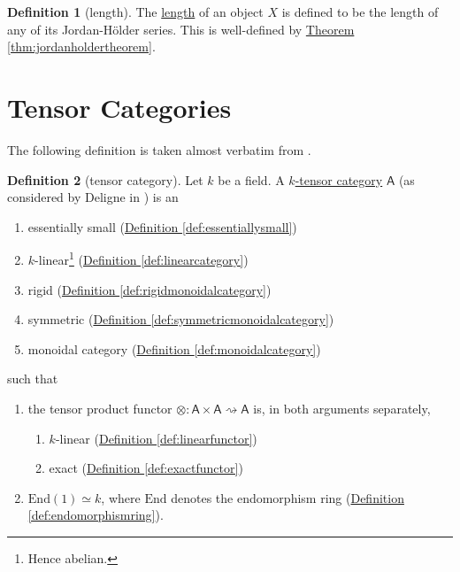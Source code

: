 \documentclass[a4paper,10pt]{scrreprt}
\newcommand{\defn}[1]{\ul{#1}}
\theoremstyle{definition}
\newtheorem{definition}{Definition}[section]
\theoremstyle{plain}
\theoremstyle{remark}
\begin{document}
\begin{definition}[length]
  \label{def:length}
  The \defn{length} of an object $X$ is defined to be the length of any of its Jordan-H{\"o}lder series. This is well-defined by \hyperref[thm:jordanholdertheorem]{Theorem \ref*{thm:jordanholdertheorem}}.
\end{definition}


\section{Tensor Categories}
The following definition is taken almost verbatim from \cite{nlab-deligne-theorem}.
\begin{definition}[tensor category]
  \label{def:tensorcategory}
  Let $k$ be a field. A \defn{$k$-tensor category} $\mathsf{A}$ (as considered by Deligne in \cite{deligne-categories-tensorielle}) is an
  \begin{enumerate}
    \item essentially small (\hyperref[def:essentiallysmall]{Definition \ref*{def:essentiallysmall}})

    \item $k$-linear\footnote{Hence abelian.} (\hyperref[def:linearcategory]{Definition \ref*{def:linearcategory}})

    \item rigid (\hyperref[def:rigidmonoidalcategory]{Definition \ref*{def:rigidmonoidalcategory}})

    \item symmetric (\hyperref[def:symmetricmonoidalcategory]{Definition \ref*{def:symmetricmonoidalcategory}})

    \item monoidal category (\hyperref[def:monoidalcategory]{Definition \ref*{def:monoidalcategory}})
  \end{enumerate}
  such that 
  \begin{enumerate}
    \item the tensor product functor $\otimes\colon \mathsf{A} \times \mathsf{A} \rightsquigarrow \mathsf{A}$ is, in both arguments separately,
      \begin{enumerate}
        \item $k$-linear (\hyperref[def:linearfunctor]{Definition \ref*{def:linearfunctor}})

        \item exact (\hyperref[def:exactfunctor]{Definition \ref*{def:exactfunctor}})
      \end{enumerate}

    \item $\mathrm{End}(1) \simeq k$, where $\mathrm{End}$ denotes the endomorphism ring (\hyperref[def:endomorphismring]{Definition \ref*{def:endomorphismring}}).
  \end{enumerate}
\end{definition}
\end{document}
